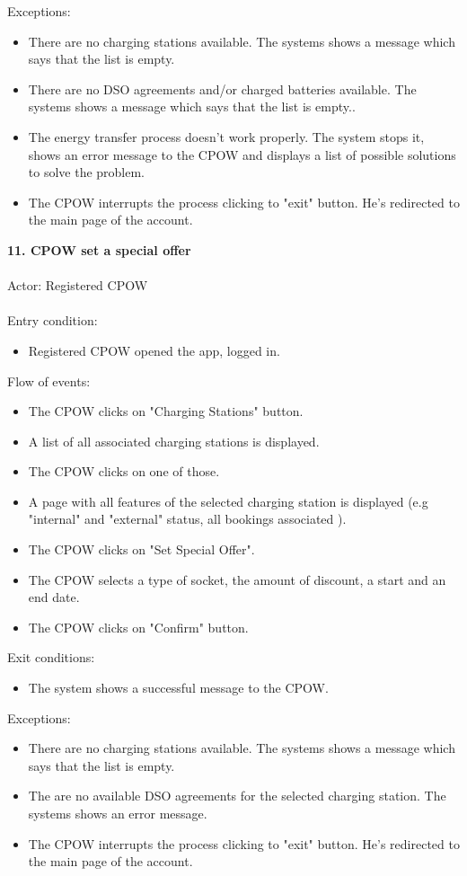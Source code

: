\documentclass[a4paper]{report}
\begin{document}
Exceptions: 
\begin{itemize}
\item There are no charging stations available. The systems shows a message which says that the list is empty.
\item There are no DSO agreements and/or charged batteries available. The systems shows a message which says that the list is empty..
\item The energy transfer process doesn't work properly. The system stops it, shows an error message to the CPOW and displays a list of possible solutions to solve the problem.
\item The CPOW interrupts the process clicking to "exit" button. He's redirected to the main page of the account.
\end{itemize}
\textbf{11. CPOW set a special offer}\label{uc:8}
\\ \\
Actor: Registered CPOW \\ \\
Entry condition: 
\begin{itemize}
\item Registered CPOW opened the app, logged in.
\end{itemize}
Flow of events:
\begin{itemize}
\item The CPOW clicks on "Charging Stations" button.
\item A list of all associated charging stations is displayed.
\item The CPOW clicks on one of those.
\item A page with all features of the selected charging station is displayed (e.g "internal" and "external" status, all bookings associated ).
\item The CPOW clicks on "Set Special Offer".
\item The CPOW selects a type of socket, the amount of discount, a start and an end date.
\item The CPOW clicks on "Confirm" button.
\end{itemize}
Exit conditions: 
\begin{itemize}
\item The system shows a successful message to the CPOW.
\end{itemize} 
Exceptions: 
\begin{itemize}
\item There are no charging stations available. The systems shows a message which says that the list is empty.
\item The are no available DSO agreements for the selected charging station. The systems shows an error message.
\item The CPOW interrupts the process clicking to "exit" button. He's redirected to the main page of the account.
\end{itemize}
\end{document}
